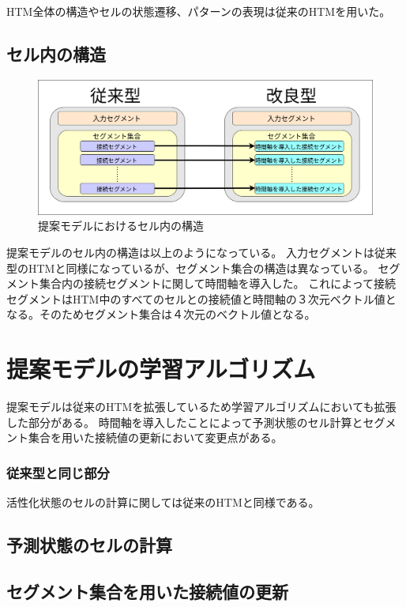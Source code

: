 HTM全体の構造やセルの状態遷移、パターンの表現は従来のHTMを用いた。

\subsection{セル内の構造}

\begin{figure}[ht]
  \begin{center}
    \includegraphics[width=14cm]{./fig/drawing_9}
    \caption{提案モデルにおけるセル内の構造}
    \label{fig:HTM_improved}
  \end{center}
\end{figure}

提案モデルのセル内の構造は以上のようになっている。
入力セグメントは従来型のHTMと同様になっているが、セグメント集合の構造は異なっている。
セグメント集合内の接続セグメントに関して時間軸を導入した。
これによって接続セグメントはHTM中のすべてのセルとの接続値と時間軸の３次元ベクトル値となる。そのためセグメント集合は４次元のベクトル値となる。

\section{提案モデルの学習アルゴリズム}
提案モデルは従来のHTMを拡張しているため学習アルゴリズムにおいても拡張した部分がある。
時間軸を導入したことによって予測状態のセル計算とセグメント集合を用いた接続値の更新において変更点がある。

\subsubsection{従来型と同じ部分}

活性化状態のセルの計算に関しては従来のHTMと同様である。

\subsection{予測状態のセルの計算}

\subsection{セグメント集合を用いた接続値の更新}
